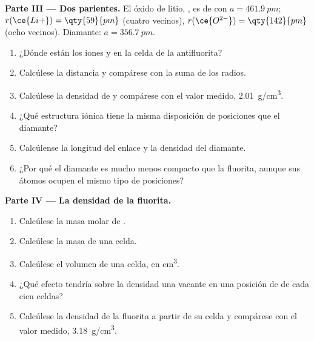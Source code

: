 \begin{problem}
\medskip
\noindent\textbf{Parte III --- Dos parientes.}
El óxido de litio, , es de  con
$a = \qty{461.9}{pm}$; $r(\ce{Li+}) = \qty{59}{pm}$ (cuatro vecinos),
$r(\ce{O^{2-}}) =
\qty{142}{pm}$ (ocho vecinos). Diamante: $a = \qty{356.7}{pm}$.
\begin{enumerate}[resume]
  \item ¿Dónde están los iones  y  en la celda de la
        antifluorita?
  \item Calcúlese la distancia  y compárese con la suma de los
        radios.
  \item Calcúlese la densidad de  y compárese con el valor
        medido, \qty{2.01}{g/cm^3}.
  \item ¿Qué estructura iónica tiene la misma disposición de posiciones
        que el diamante?
  \item Calcúlense la longitud del enlace  y la densidad del
        diamante.
  \item ¿Por qué el diamante es mucho menos compacto que la fluorita,
        aunque sus átomos ocupen el mismo tipo de posiciones?
\end{enumerate}

\medskip
\noindent\textbf{Parte IV --- La densidad de la fluorita.}
\begin{enumerate}[resume]
  \item Calcúlese la masa molar de .
  \item Calcúlese la masa de una celda.
  \item Calcúlese el volumen de una celda, en \unit{cm^3}.
  \item ¿Qué efecto tendría sobre la densidad una vacante en una posición
        de  de cada cien celdas?
  \item Calcúlese la densidad de la fluorita a partir de su celda y
        compárese con el valor medido, \qty{3.18}{g/cm^3}.
\end{enumerate}
\end{problem}
